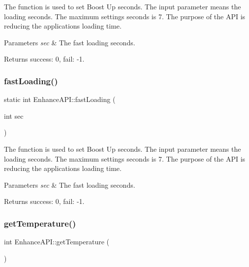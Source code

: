 The function is used to set Boost Up seconds. The input parameter means the loading seconds. The maximum settings seconds is 7. The purpose of the A\+PI is reducing the application\textquotesingle{}s loading time. 


\begin{DoxyParams}{Parameters}
{\em sec} & The fast loading seconds. \\
\hline
\end{DoxyParams}
\begin{DoxyReturn}{Returns}
success\+: 0, fail\+: -\/1. 
\end{DoxyReturn}
\mbox{\label{classEnhanceAPI_a971131b6cc44e55336d31deb3a7f8063}} 
\subsubsection{\texorpdfstring{fast\+Loading()}{fastLoading()}\hspace{0.1cm}{\footnotesize\ttfamily [2/2]}}
{\footnotesize\ttfamily static int Enhance\+A\+P\+I\+::fast\+Loading (\begin{DoxyParamCaption}\item[{int}]{sec }\end{DoxyParamCaption})\hspace{0.3cm}{\ttfamily [static]}}



The function is used to set Boost Up seconds. The input parameter means the loading seconds. The maximum settings seconds is 7. The purpose of the A\+PI is reducing the application\textquotesingle{}s loading time. 


\begin{DoxyParams}{Parameters}
{\em sec} & The fast loading seconds. \\
\hline
\end{DoxyParams}
\begin{DoxyReturn}{Returns}
success\+: 0, fail\+: -\/1. 
\end{DoxyReturn}
\mbox{\label{classEnhanceAPI_abf1d3068cc786539099418d67aa9ea4e}} 
\subsubsection{\texorpdfstring{get\+Temperature()}{getTemperature()}\hspace{0.1cm}{\footnotesize\ttfamily [1/2]}}
{\footnotesize\ttfamily int Enhance\+A\+P\+I\+::get\+Temperature (\begin{DoxyParamCaption}{ }\end{DoxyParamCaption})\hspace{0.3cm}{\ttfamily [static]}}




